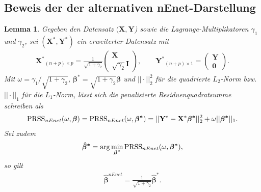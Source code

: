 \documentclass[12pt, a4paper]{report}\usepackage[]{graphicx}\usepackage[]{color}
\newtheorem{lemma}{Lemma}
\begin{document}
\begin{appendix}
\section{Beweis der der alternativen nEnet-Darstellung}\label{App_Beweis_Naiv_Zou_Darstellung}
\begin{lemma}\label{Lemma_Naiv_Enet}
Gegeben den Datensatz $(\mathbf{X}, \mathbf{Y}$) sowie die Lagrange-Multiplikatoren $\gamma_1$ und $\gamma_2$, sei $(\mathbf{X^*}, \mathbf{Y^*})$ ein erweiterter Datensatz mit
\begin{align}\label{Eq_Erweiterter_Datensatz_Enet}
\mathbf{X^*}_{(n+p)\times p} = \frac{1}{\sqrt{1+\gamma_2}}
\begin{pmatrix}
\mathbf{X}\\
\sqrt{\gamma_2}\mathbf{I}
\end{pmatrix}, 
\qquad 
\mathbf{Y^*}_{(n+p) \times 1}=\begin{pmatrix}
\mathbf{Y}\\
\mathbf{0}
\end{pmatrix}.
\end{align}
Mit $\omega = \gamma_1 /\sqrt{1+\gamma_2}$, $\boldsymbol{\beta^*}=\sqrt{1+\gamma_2}\boldsymbol{\beta}$ und $||\cdot||^2_2$ für die quadrierte $L_2$-Norm bzw. $||\cdot||_1$ für die $L_1$-Norm, lässt sich die penalisierte Residuenquadratsumme schreiben als 
\begin{align}\label{Eq_Naiv_Enet_Lassoform}
\textnormal{PRSS}_{nEnet}(\omega, \boldsymbol{\beta})=\textnormal{PRSS}_{nEnet}(\omega, \boldsymbol{\beta^*})=||\mathbf{Y^*} -\mathbf{X^*}\boldsymbol{\beta^*}||^2_2+\omega||\boldsymbol{\beta^*}||_1.
\end{align}
Sei zudem
\begin{align*}
\boldsymbol{\hat{\beta}^*}=\arg \displaystyle\min_{\boldsymbol{\beta^*}} \textnormal{PRSS}_{nEnet}(\omega, \boldsymbol{\beta^*}),
\end{align*}
so gilt
\begin{align}\label{Eq_Naiv_Enet_Zou}
\boldsymbol{\hat{\beta}}^{nEnet}=\frac{1}{\sqrt{1+\gamma_2}}\boldsymbol{\hat{\beta}^*}.
\end{align}
\end{lemma}


\end{appendix}
\end{document}
